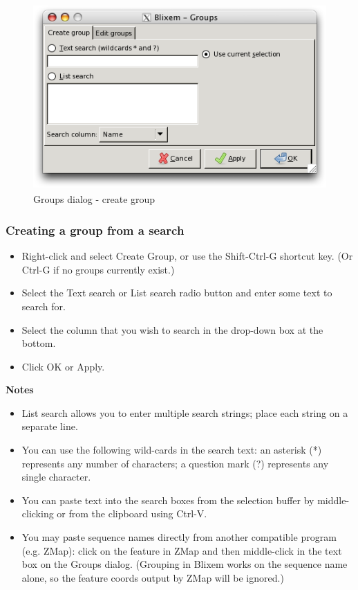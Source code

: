 \documentclass[letterpaper]{article}
\newcommand\liststyleWWviiiNumxvi{%
\renewcommand\labelitemi{{\textbullet}}
\renewcommand\labelitemii{o}
\renewcommand\labelitemiii{[F0A7?]}
\renewcommand\labelitemiv{[F0B7?]}
}
\begin{document}
\begin{figure}
\centering
\color[rgb]{0.30980393,0.5058824,0.7411765}
\includegraphics[width=11.95cm,height=7.084cm]{img_dialog_groups.png}
\caption{Groups dialog - create group}
\end{figure}

{\color[rgb]{0.30980393,0.5058824,0.7411765}\subsubsection[Creating a group from a search]{Creating a group from a search}}
\hypertarget{RefHeading33212258250716}{}\liststyleWWviiiNumxvi
\begin{itemize}
\item {
Right-click and select {\textquotesingle}Create Group{\textquotesingle},
or use the Shift-Ctrl-G shortcut key. (Or Ctrl-G if no groups currently
exist.)}
\item {
Select the {\textquotesingle}Text search{\textquotesingle} or
{\textquotesingle}List search{\textquotesingle} radio button and enter
some text to search for.}
\item {
Select the column that you wish to search in the drop-down box at the
bottom.}
\item {
Click OK or Apply.}
\end{itemize}

\bigskip

{\bfseries
Notes}

\liststyleWWviiiNumxvi
\begin{itemize}
\item {{\textquotesingle}List search{\textquotesingle} allows you to enter multiple search strings; place each string on a separate line.}
\item {You can use the following wild-cards in the search text: an asterisk (*) represents any number of characters; a question mark (?) represents any single character.}
\item {You can paste text into the search boxes from the selection buffer by middle-clicking or from the clipboard using Ctrl-V.}
\item {You may paste sequence names directly from another compatible program (e.g. ZMap): click on the feature in ZMap and then middle-click in the text box on the Groups dialog. (Grouping in Blixem works on the sequence name alone, so the feature coords output by ZMap will be ignored.)}
\end{itemize}
\end{document}
